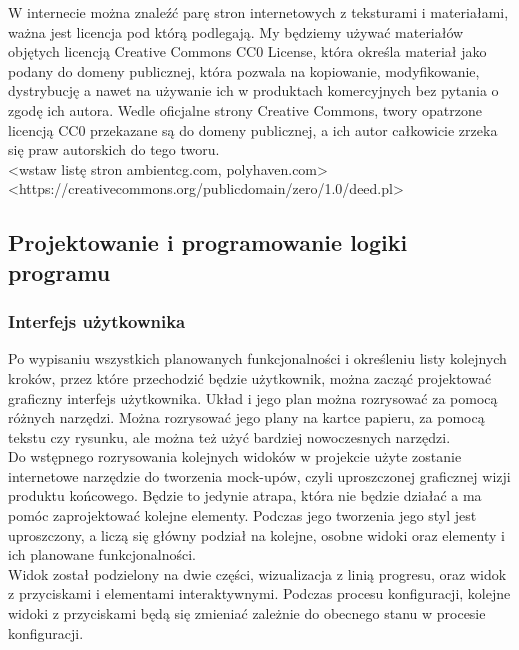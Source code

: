 \documentclass{article} %
\begin{document}
            W internecie można znaleźć parę stron internetowych z teksturami i materiałami, ważna jest licencja pod którą podlegają. My będziemy używać materiałów objętych licencją Creative Commons CC0 License, która określa materiał jako podany do domeny publicznej, która pozwala na kopiowanie, modyfikowanie, dystrybucję a nawet na używanie ich w produktach komercyjnych bez pytania o zgodę ich autora. Wedle oficjalne strony Creative Commons, twory opatrzone licencją CC0 przekazane są do domeny publicznej, a ich autor całkowicie zrzeka się praw autorskich do tego tworu.
            \\
            
            <wstaw listę stron ambientcg.com, polyhaven.com> \\
            <https://creativecommons.org/publicdomain/zero/1.0/deed.pl>
            \\
            
            
            
    \subsection{Projektowanie i programowanie logiki programu}
    
        \subsubsection{Interfejs użytkownika}
            Po wypisaniu wszystkich planowanych funkcjonalności i określeniu listy kolejnych kroków, przez które przechodzić będzie użytkownik, można zacząć projektować graficzny interfejs użytkownika. Układ i jego plan można rozrysować za pomocą różnych narzędzi. Można rozrysować jego plany na kartce papieru, za pomocą tekstu czy rysunku, ale można też użyć bardziej nowoczesnych narzędzi.
            \\
            
            Do wstępnego rozrysowania kolejnych widoków w projekcie użyte zostanie internetowe narzędzie do tworzenia mock-upów, czyli uproszczonej graficznej wizji produktu końcowego. Będzie to jedynie atrapa, która nie będzie działać a ma pomóc zaprojektować kolejne elementy. Podczas jego tworzenia jego styl jest uproszczony, a liczą się główny podział na kolejne, osobne widoki oraz elementy i ich planowane funkcjonalności.
            \\
            
            Widok został podzielony na dwie części, wizualizacja z linią progresu, oraz widok z przyciskami i elementami interaktywnymi. Podczas procesu konfiguracji, kolejne widoki z przyciskami będą się zmieniać zależnie do obecnego stanu w procesie konfiguracji. 
            \\
            
\end{document}
